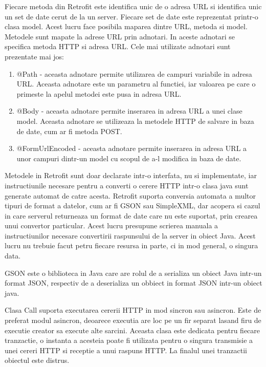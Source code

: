 Fiecare metoda din Retrofit este identifica unic de o adresa URL si identifica unic un set de date cerut de la un server. Fiecare set de date este 
reprezentat printr-o clasa model. Acest lucru face posibila maparea dintre URL, metoda si model. Metodele sunt mapate la adrese URL prin adnotari. 
In aceste adnotari se specifica metoda HTTP si adresa URL. Cele mai utilizate adnotari sunt prezentate mai jos:
\begin{enumerate}
	\item @Path - aceasta adnotare permite utilizarea de campuri variabile in adresa URL. Aceasta adnotare este un parametru al functiei, iar valoarea 
	pe care o primeste la apelul metodei este pusa in adresa URL.
    \item @Body - aceasta adnotare permite inserarea in adresa URL a unei clase model. Aceasta adnotare se utilizeaza la metodele HTTP de salvare 
    in baza de date, cum ar fi metoda POST.
    \item @FormUrlEncoded - aceasta adnotare permite inserarea in adresa URL a unor campuri dintr-un model cu scopul de a-l modifica in baza de date.
\end{enumerate}

Metodele in Retrofit sunt doar declarate intr-o interfata, nu si implementate, iar instructiunile necesare pentru a converti o cerere HTTP intr-o clasa java 
sunt generate automat de catre acesta. Retrofit suporta conversia automata a multor tipuri de format a datelor, cum ar fi GSON sau SimpleXML, dar acopera si 
cazul in care serverul returneaza un format de date care nu este suportat, prin crearea unui convertor particular. Acest lucru presupune scrierea 
manuala a instructiunilor necesare convertirii raspunsului de la server in obiect Java. Acest lucru nu trebuie facut petru fiecare resursa in parte, ci 
in mod general, o singura data.

GSON este o biblioteca in Java care are rolul de a serializa un obiect Java intr-un format JSON, respectiv de a deserializa un obbiect in format JSON intr-un 
obiect java.   

Clasa Call suporta executarea cererii HTTP in mod sincron sau asincron. Este de preferat modul asincron, deoarece executia are loc pe un fir separat lasand 
firu de executie creator sa execute alte sarcini. Aceasta clasa este dedicata pentru fiecare tranzactie, o instanta a acesteia poate fi utilizata pentru 
o singura transmisie a unei cereri HTTP si receptie a unui raspuns HTTP. La finalul unei tranzactii obiectul este distrus.

